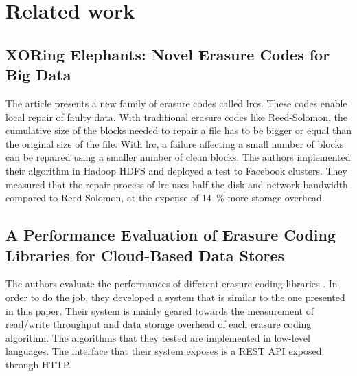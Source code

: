 \section{Related work}

\subsection{XORing Elephants: Novel Erasure Codes for Big Data}

The article \autocite{XorbasVLDB} presents a new family of erasure codes called \acp{lrc}.
These codes enable local repair of faulty data.
With traditional erasure codes like Reed-Solomon, the cumulative size of the blocks needed to repair a file has to be bigger or equal than the original size of the file.
With \ac{lrc}, a failure affecting a small number of blocks can be repaired using a smaller number of clean blocks.
The authors implemented their algorithm in Hadoop HDFS and deployed a test to Facebook clusters.
They measured that the repair process of \ac{lrc} uses half the disk and network bandwidth compared to Reed-Solomon, at the expense of \SI{14}{\percent} more storage overhead.

\subsection{A Performance Evaluation of Erasure Coding Libraries for Cloud-Based Data Stores}

The authors evaluate the performances of different erasure coding libraries \autocite{Burihabwa2016}.
In order to do the job, they developed a system that is similar to the one presented in this paper.
Their system is mainly geared towards the measurement of read/write throughput and data storage overhead of each erasure coding algorithm.
The algorithms that they tested are implemented in low-level languages.
The interface that their system exposes is a REST API exposed through HTTP.


